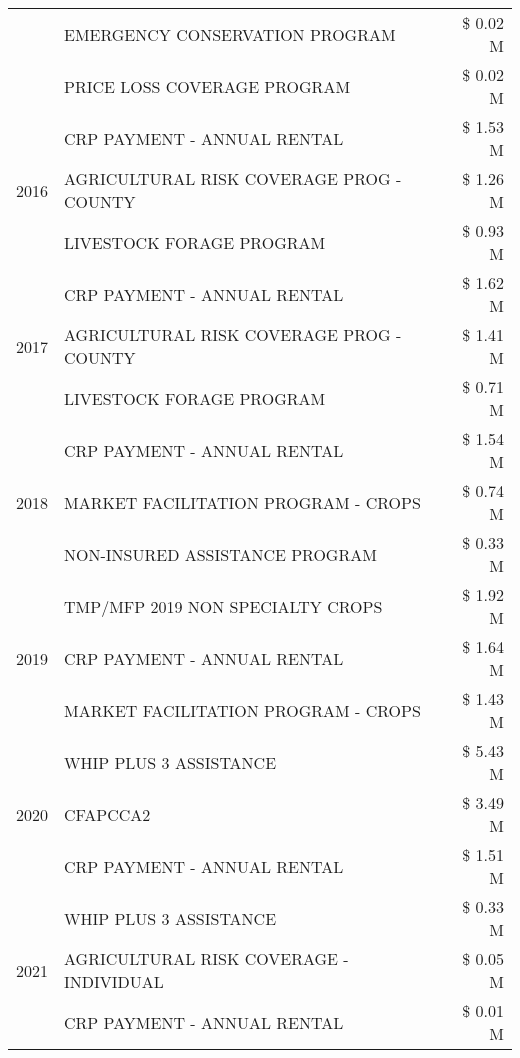 \begin{tabular}{llr}
 & EMERGENCY CONSERVATION PROGRAM & \$ 0.02 M \\
 & PRICE LOSS COVERAGE PROGRAM & \$ 0.02 M \\
\cline{1-3}
\multirow[t]{3}{*}{2016} & CRP PAYMENT - ANNUAL RENTAL & \$ 1.53 M \\
 & AGRICULTURAL RISK COVERAGE PROG - COUNTY & \$ 1.26 M \\
 & LIVESTOCK FORAGE PROGRAM & \$ 0.93 M \\
\cline{1-3}
\multirow[t]{3}{*}{2017} & CRP PAYMENT - ANNUAL RENTAL & \$ 1.62 M \\
 & AGRICULTURAL RISK COVERAGE PROG - COUNTY & \$ 1.41 M \\
 & LIVESTOCK FORAGE PROGRAM & \$ 0.71 M \\
\cline{1-3}
\multirow[t]{3}{*}{2018} & CRP PAYMENT - ANNUAL RENTAL & \$ 1.54 M \\
 & MARKET FACILITATION PROGRAM - CROPS & \$ 0.74 M \\
 & NON-INSURED ASSISTANCE PROGRAM & \$ 0.33 M \\
\cline{1-3}
\multirow[t]{3}{*}{2019} & TMP/MFP 2019 NON SPECIALTY CROPS & \$ 1.92 M \\
 & CRP PAYMENT - ANNUAL RENTAL & \$ 1.64 M \\
 & MARKET FACILITATION PROGRAM - CROPS & \$ 1.43 M \\
\cline{1-3}
\multirow[t]{3}{*}{2020} & WHIP PLUS 3 ASSISTANCE & \$ 5.43 M \\
 & CFAPCCA2 & \$ 3.49 M \\
 & CRP PAYMENT - ANNUAL RENTAL & \$ 1.51 M \\
\cline{1-3}
\multirow[t]{3}{*}{2021} & WHIP PLUS 3 ASSISTANCE & \$ 0.33 M \\
 & AGRICULTURAL RISK COVERAGE - INDIVIDUAL & \$ 0.05 M \\
 & CRP PAYMENT - ANNUAL RENTAL & \$ 0.01 M \\
\cline{1-3}
\bottomrule
\end{tabular}
